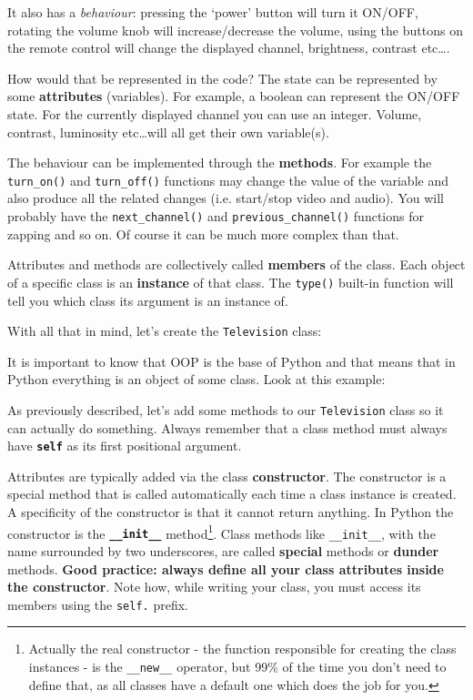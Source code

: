 It also has a \textit{behaviour}: pressing the `power' button will turn it ON/OFF, rotating the volume knob will increase/decrease the volume, using the buttons on the remote control will change the displayed channel, brightness, contrast etc\dots. 

How would that be represented in the code? The state can be represented by some \textbf{attributes} (variables). For example, a boolean can represent the ON/OFF state. For the currently displayed channel you can use an integer. Volume, contrast, luminosity etc\dots will all get their own variable(s).

The behaviour can be implemented through the \textbf{methods}. For example the \texttt{turn\_on()} and \texttt{turn\_off()} functions may change the value of the variable and also produce all the related changes (i.e. start/stop video and audio). You will probably have the \texttt{next\_channel()} and \texttt{previous\_channel()} functions for zapping and so on. Of course it can be much more complex than that.

Attributes and methods are collectively called \textbf{members} of the class. Each object of a specific class is an \textbf{instance} of that class. The \texttt{type()} built-in function will tell you which class its argument is an instance of. 

With all that in mind, let's create the \texttt{Television} class:



\hrulefill

It is important to know that OOP is the base of Python and that means that in Python everything is an object of some class. Look at this example:


\hrulefill

As previously described, let's add some methods to our \texttt{Television} class so it can actually do something. Always remember that a class method must always have \textbf{\texttt{self}} as its first positional argument.



Attributes are typically added via the class \textbf{constructor}. The constructor is a special method that is called automatically each time a class instance is created. A specificity of the constructor is that it cannot return anything. In Python the constructor is the \textbf{\texttt{\_\_init\_\_}} method\footnote{Actually the real constructor - the function responsible for creating the class instances - is the \texttt{\_\_new\_\_} operator, but 99\% of the time you don't need to define that, as all classes have a default one which does the job for you.}. Class methods like \texttt{\_\_init\_\_}, with the name surrounded by two underscores, are called \textbf{special} methods or \textbf{dunder} methods. \textbf{Good practice: always define all your class attributes inside the constructor}. Note how, while writing your class, you must access its members using the \texttt{self.} prefix.

